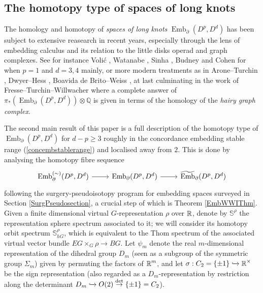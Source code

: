 \documentclass[a4paper, oneside]{amsart}
\newcommand{\emb}{\operatorname{Emb}}
\newcommand{\bemb}{\widetilde{\operatorname{Emb}}}
\newcommand{\1}{\mathds{1}}
\theoremstyle{remark}
\theoremstyle{definition}
\newcommand{\R}{{\scaleobj{0.97}{\mathbb{R}}}}
\newcommand{\Q}{\mathbb{Q}}
\newcommand{\s}{\mathbb{S}}
\newcommand{\pemb}{\operatorname{Emb}^{(\sim)}}
\numberwithin{equation}{section}
\begin{document}
\subsection{The homotopy type of spaces of long knots} The homology and homotopy of \emph{spaces of long knots} $\emb_\partial(D^p,D^d)$ has been subject to extensive reasearch in recent years, especially through the lens of embedding calculus and its relation to the little disks operad and graph complexes. See for instance Volić \cite{VolicLongKnots}, Watanabe \cite{WatanabeLongKnots}, Sinha \cite{DevPSinha2009}, Budney and Cohen \cite{BudneyIntegralLongKnots, BudneyCohen} for when $p=1$ and $d=3,4$ mainly, or more modern treatments as in Arone--Turchin \cite{AroneTurchinHomologyLK, AroneTurchinHomotopyLK}, Dwyer--Hess \cite{DwyerHess}, Boavida de Brito--Weiss \cite{BoavidadeBritoWeissLK}, at last culminating in the work of Fresse--Turchin--Willwacher \cite{FresseTurchinWillwacher} where a complete answer of $\pi_*(\emb_\partial(D^p,D^d))\otimes \Q$ is given in terms of the homology of the \textit{hairy graph complex}.

The second main result of this paper is a full description of the homotopy type of $\emb_\partial(D^p, D^d)$ for $d-p\geq 3$ roughly in the concordance embedding stable range (\ref{concembstablerange}) and localised away from $2$. This is done by analysing the homotopy fibre sequence
\begin{equation}\label{knotfibseq1}
\begin{tikzcd}
\pemb_\partial(D^p,D^d)\rar & \emb_\partial(D^p, D^d)\rar & \bemb_{\partial}(D^p,D^d)
\end{tikzcd}
\end{equation}
following the surgery-pseudoisotopy program for embedding spaces surveyed in Section \ref{SurgPseudosection}, a crucial step of which is Theorem \ref{EmbWWIThm}. Given a finite dimensional virtual $G$-representation $\rho$ over $\R$, denote by $\s^\rho$ the representation sphere spectrum associated to it; we will consider its homotopy orbit spectrum $\s^\rho_{hG}$, which is equivalent to the Thom spectrum of the associated virtual vector bundle $EG\times_G\rho\to BG$. Let $\psi_m$ denote the real $m$-dimensional representation of the dihedral group $D_m$ (seen as a subgroup of the symmetric group $\Sigma_m$) given by permuting the factors of $\R^m$, and let $\sigma: C_2=\{\pm 1\}\xhookrightarrow{}\R^\times$ be the sign representation (also regarded as a $D_m$-representation by restriction along the determinant $D_m\xhookrightarrow{}O(2)\overset\det\to \{\pm 1\}= C_2$). 
\end{document}
